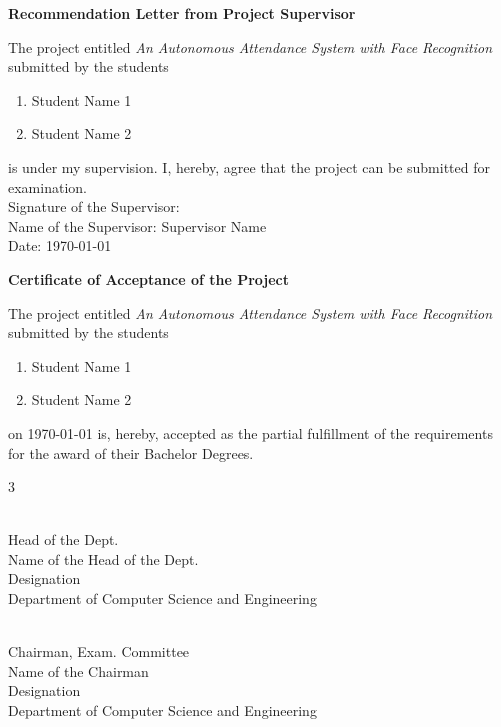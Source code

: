 \begin{titlepage}
\newpage
\begin{center}
    \textbf{\huge Recommendation Letter from Project Supervisor}
\end{center}
\noindent
The project entitled \emph{An Autonomous Attendance System with Face Recognition}
submitted by the students
\begin{enumerate}
    \item Student Name 1
    \item Student Name 2
\end{enumerate}
is under my supervision. I, hereby, agree that the project can be submitted for
examination.\\

\vspace{2.0cm}
\noindent
Signature of the Supervisor: \\
Name of the Supervisor: Supervisor Name\\
Date: \today

\newpage
\begin{center}
    \textbf{\huge Certificate of Acceptance of the Project}
\end{center}
\noindent
The project entitled \emph{An Autonomous Attendance System with Face Recognition}
submitted by the students
\begin{enumerate}
    \item Student Name 1
    \item Student Name 2
\end{enumerate}
on \today{} is, hereby, accepted as the partial fulfillment of the requirements for
the award of their Bachelor Degrees.
\vspace{2.0cm}

\begin{multicols}{3}
    \begin{flushleft}
        \hrulefill \\
        {\hspace{0.3mm}Head of the Dept.\\\hspace{0.3mm}Name of the Head of the Dept. \\
        \hspace{0.3mm}Designation\\\hspace{0.3mm}Department of Computer Science and Engineering}\\
    \end{flushleft}

    \begin{flushleft}
        \hrulefill \\
        {\hspace{0.5mm}Chairman, Exam. Committee\\\hspace{0.5mm}Name of the Chairman\\
        \hspace{0.5mm}Designation\\\hspace{0.5mm}Department of Computer Science and Engineering}\\
    \end{flushleft}


\end{multicols}
\end{titlepage}
